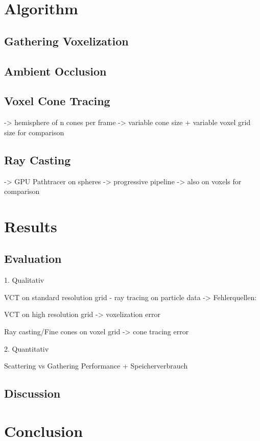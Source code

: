\documentclass[hyperref,german,diplominf]{cgvpub}
\begin{document}
\chapter{Algorithm}

\section{Gathering Voxelization}

\section{Ambient Occlusion}

\section{Voxel Cone Tracing}
-> hemisphere of n cones per frame
-> variable cone size + variable voxel grid size for comparison

\section{Ray Casting}
-> GPU Pathtracer on spheres
-> progressive pipeline
-> also on voxels for comparison

\chapter{Results}
\section{Evaluation}

1. Qualitativ

VCT on standard resolution grid - ray tracing on particle data -> Fehlerquellen:

VCT on high resolution grid -> voxelization error

Ray casting/Fine cones on voxel grid -> cone tracing error

2. Quantitativ

Scattering vs Gathering Performance + Speicherverbrauch

\section{Discussion}
\chapter{Conclusion}
\end{document}
